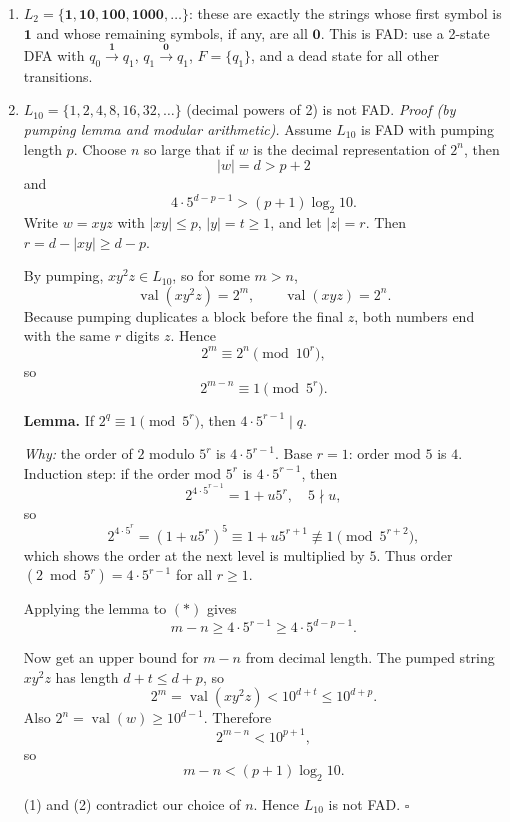 \begin{enumerate}[{2.}1.]
\begin{enumerate}
\item $L_2=\{\mathbf{1},\mathbf{10},\mathbf{100},\mathbf{1000},\ldots\}$: these are exactly the strings whose first symbol is $\mathbf 1$ and whose remaining symbols, if any, are all $\mathbf 0$. This is FAD: use a 2-state DFA with $q_0\xrightarrow{\mathbf{1}}q_1$, $q_1\xrightarrow{\mathbf{0}}q_1$, $F=\{q_1\}$, and a dead state for all other transitions.

\item $L_{10}=\{1,2,4,8,16,32,\ldots\}$ (decimal powers of 2) is not FAD.
\textit{Proof (by pumping lemma and modular arithmetic).}
Assume $L_{10}$ is FAD with pumping length $p$.
Choose $n$ so large that if $w$ is the decimal representation of $2^n$, then
\[
|w|=d>p+2
\]
and
\[
4\cdot 5^{ d-p-1}>(p+1)\log_2 10.
\]
Write $w=xyz$ with $|xy|\le p$, $|y|=t\ge1$, and let $|z|=r$.
Then $r=d-|xy|\ge d-p$.

By pumping, $xy^2z\in L_{10}$, so for some $m>n$,
\[
\operatorname{val}(xy^2z)=2^m,\qquad \operatorname{val}(xyz)=2^n.
\]
Because pumping duplicates a block before the final $z$, both numbers end with the same $r$ digits $z$.
Hence
\[
2^m\equiv 2^n \pmod{10^r},
\]
so
\[
2^{m-n}\equiv 1 \pmod{5^r}. \tag{*}
\]

\textbf{Lemma.} If $2^q\equiv1\pmod{5^r}$, then $4\cdot 5^{r-1}\mid q$.

\textit{Why:} the order of $2$ modulo $5^r$ is $4\cdot 5^{r-1}$.
Base $r=1$: order mod $5$ is $4$.
Induction step: if the order mod $5^r$ is $4\cdot5^{r-1}$, then
\[
2^{4\cdot5^{r-1}}=1+u5^r,\quad 5\nmid u,
\]
so
\[
2^{4\cdot5^r}=(1+u5^r)^5\equiv 1+u5^{r+1}\not\equiv1\pmod{5^{r+2}},
\]
which shows the order at the next level is multiplied by $5$.
Thus order$(2\bmod 5^r)=4\cdot5^{r-1}$ for all $r\ge1$.

Applying the lemma to $(*)$ gives
\[
m-n\ge 4\cdot 5^{r-1}\ge 4\cdot 5^{d-p-1}. \tag{1}
\]

Now get an upper bound for $m-n$ from decimal length.
The pumped string $xy^2z$ has length $d+t\le d+p$, so
\[
2^m=\operatorname{val}(xy^2z)<10^{d+t}\le 10^{d+p}.
\]
Also $2^n=\operatorname{val}(w)\ge 10^{d-1}$.
Therefore
\[
2^{m-n}<10^{p+1},
\]
so
\[
m-n<(p+1)\log_2 10. \tag{2}
\]

(1) and (2) contradict our choice of $n$.
Hence $L_{10}$ is not FAD. $\square$
\end{enumerate}

\end{enumerate}
